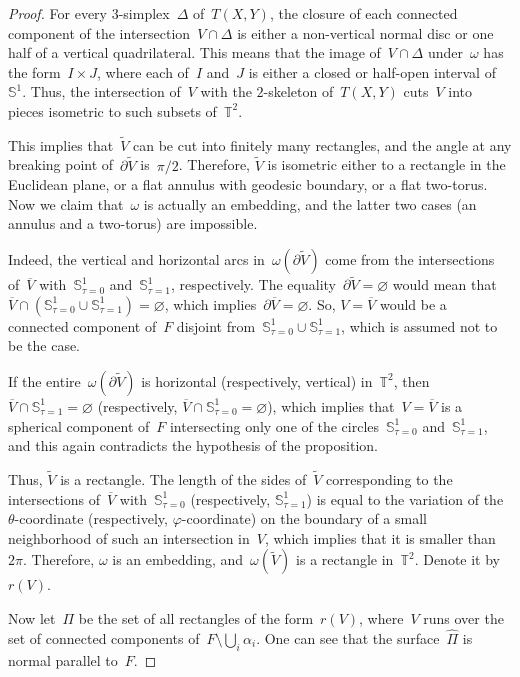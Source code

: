 \documentclass[10pt,a4paper]{amsart}
\begin{document}
\begin{proof}
For every $3$-simplex~$\Delta$ of~$T(X,Y)$,
the closure of each connected component of the intersection~$V\cap\Delta$ is either a non-vertical normal disc
or one half of a vertical quadrilateral. This means that the image of~$V\cap\Delta$ under~$\omega$
has the form~$I\times J$, where each of~$I$ and~$J$ is either a closed or half-open interval of~$\mathbb S^1$.
Thus, the intersection of~$V$ with the $2$-skeleton of~$T(X,Y)$ cuts~$V$ into pieces isometric to such
subsets of~$\mathbb T^2$.

This implies that~$\widetilde V$ can be cut into finitely many rectangles, and the angle at any breaking point
of~$\partial\widetilde V$ is~$\pi/2$. Therefore, $\widetilde V$
is isometric either to a rectangle in the Euclidean plane, or a flat annulus with geodesic
boundary, or a flat two-torus. Now we claim that~$\omega$ is actually an embedding, and the latter
two cases (an annulus and a two-torus) are impossible.

Indeed, the vertical and horizontal arcs in~$\omega(\partial\widetilde V)$ come from the intersections of~$\overline V$
with~$\mathbb S^1_{\tau=0}$ and~$\mathbb S^1_{\tau=1}$, respectively. The equality~$\partial\widetilde V=\varnothing$
would mean that~$\overline V\cap(\mathbb S^1_{\tau=0}\cup\mathbb S^1_{\tau=1})=\varnothing$,
which implies~$\partial\overline V=\varnothing$. So, $V=\overline V$ would be a connected component of~$F$
disjoint from~$\mathbb S^1_{\tau=0}\cup\mathbb S^1_{\tau=1}$, which is assumed not to be the case.

If the entire~$\omega(\partial\widetilde V)$ is horizontal (respectively, vertical) in~$\mathbb T^2$,
then~$\overline V\cap\mathbb S^1_{\tau=1}=\varnothing$ (respectively, $\overline V\cap\mathbb S^1_{\tau=0}=\varnothing$),
which implies that~$V=\overline V$ is a spherical component of~$F$ intersecting only one of the
circles~$\mathbb S^1_{\tau=0}$ and~$\mathbb S^1_{\tau=1}$, and this again contradicts the hypothesis of the proposition.

Thus, $\widetilde V$ is a rectangle. The length of the sides of~$\widetilde V$ corresponding to
the intersections of~$\overline V$ with~$\mathbb S^1_{\tau=0}$ (respectively, $\mathbb S^1_{\tau=1}$) is equal to the variation of the
$\theta$-coordinate (respectively, $\varphi$-coordinate) on the boundary of a small neighborhood of such an intersection in~$V$, which implies that it is smaller than~$2\pi$. Therefore, $\omega$ is an embedding, and~$\omega(\widetilde V)$ is a rectangle in~$\mathbb T^2$.
Denote it by~$r(V)$.

Now let~$\Pi$ be the set of all rectangles of the form~$r(V)$, where~$V$ runs over the set of connected
components of~$F\setminus\bigcup_i\alpha_i$. One can see that the surface~$\widehat\Pi$ is normal parallel to~$F$.
\end{proof}
\end{document}
